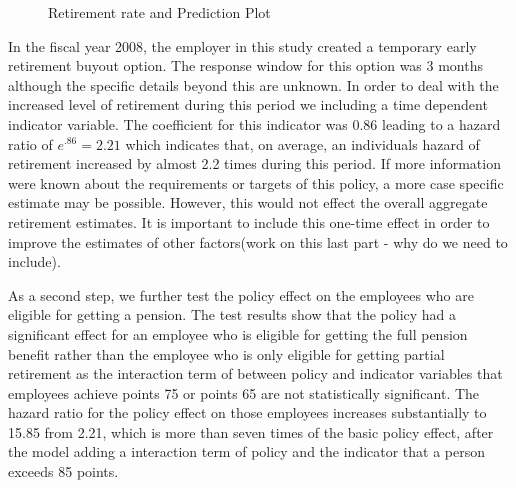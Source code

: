 \documentclass[12pt,letterpaper]{article}
\begin{document}
\begin{figure}[h!]
	\centering
	\caption{Retirement rate and Prediction Plot}
	\label{fig:rerate}
\end{figure}

In the fiscal year 2008, the employer in this study created a temporary early retirement buyout option. The response window for this option was 3 months although the specific details beyond this are unknown. In order to deal with the increased level of retirement during this period we including a time dependent indicator variable.  The coefficient for this indicator was 0.86 leading to a hazard ratio of $e^{.86} = 2.21$ which indicates that, on average, an individuals hazard of retirement increased by almost 2.2 times during this period.  If more information were known about the requirements or targets of this policy, a more case specific estimate may be possible.  However, this would not effect the overall aggregate retirement estimates.  It is important to include this one-time effect in order to improve the estimates of other factors(work on this last part - why do we need to include).

As a second step, we further test the policy effect on the employees who are eligible for getting a pension. The test results show that the policy had a significant effect for an employee who is eligible for getting the full pension benefit rather than the employee who is only eligible for getting partial retirement as the interaction term of between policy and indicator variables that employees achieve points 75 or points 65 are not statistically significant. The hazard ratio for the policy effect on those employees increases substantially to 15.85 from 2.21, which is more than seven times of the basic policy effect, after the model adding a interaction term of policy and the indicator that a person  exceeds 85 points.
\end{document}
